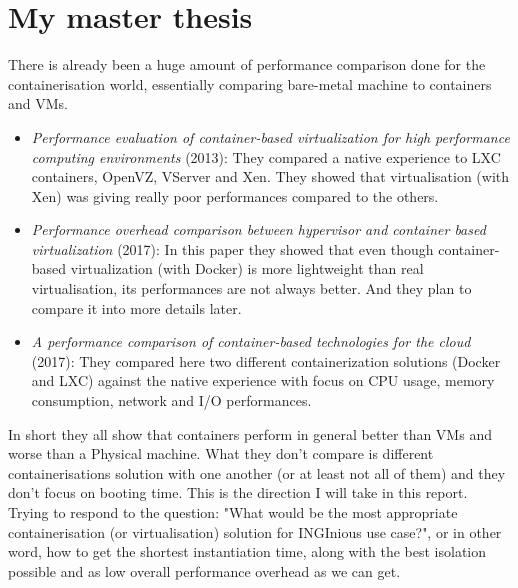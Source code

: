 \section{My master thesis}
There is already been a huge amount of performance comparison done for the containerisation world, essentially comparing bare-metal machine to containers and VMs.  
\begin{itemize}
\renewcommand\labelitemi{--}
  \item \textit{Performance evaluation of container-based virtualization for high performance computing environments}\cite{xavier2013performance} (2013): They compared a native experience to LXC containers, OpenVZ, VServer and Xen.  They showed that virtualisation (with Xen) was giving really poor performances compared to the others.
  \item \textit{Performance overhead comparison between hypervisor and container based virtualization}\cite{li2017performance} (2017):  In this paper they showed that even though container-based virtualization (with Docker) is more lightweight than real virtualisation, its performances are not always better.  And they plan to compare it into more details later.
  \item \textit{A performance comparison of container-based technologies for the cloud}\cite{kozhirbayev2017performance} (2017): They compared here two different containerization solutions (Docker and LXC) against the native experience with focus on CPU usage, memory consumption, network and I/O performances.
\end{itemize}
In short they all show that containers perform in general better than VMs and worse than a Physical machine.  What they don't compare is different containerisations solution with one another (or at least not all of them) and they don't focus on booting time.  This is the direction I will take in this report.  Trying to respond to the question: "What would be the most appropriate containerisation (or virtualisation) solution for INGInious use case?", or in other word, how to get the shortest instantiation time, along with the best isolation possible and as low overall performance overhead as we can get.
